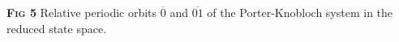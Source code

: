 \color{black}
{\footnotesize
\textbf{\textsc{Fig 5}} Relative periodic orbits $\overline{0}$ and $\overline{01}$
of the Porter-Knobloch system in the reduced state space.}
